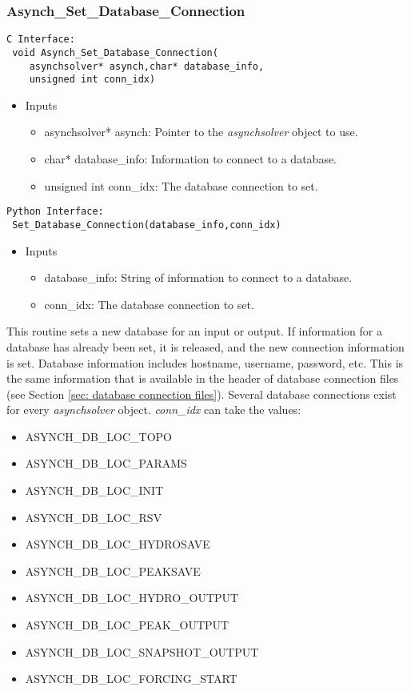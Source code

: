 \documentclass[12pt]{article}
\begin{document}
\subsubsection{Asynch\_Set\_Database\_Connection} \label{sec: asynch_set_database_connection}

\begin{lstlisting}[style=CStyle]
 C Interface:
 void Asynch_Set_Database_Connection(
	asynchsolver* asynch,char* database_info,
	unsigned int conn_idx)
\end{lstlisting}
\begin{itemize}
 \item Inputs
  \begin{itemize}
   \item asynchsolver* asynch: Pointer to the \emph{asynchsolver} object to use.
   \item char* database\_info: Information to connect to a database.
   \item unsigned int conn\_idx: The database connection to set.
  \end{itemize}
\end{itemize}
\begin{lstlisting}[style=PythonStyle]
 Python Interface:
 Set_Database_Connection(database_info,conn_idx)
\end{lstlisting}
\begin{itemize}
 \item Inputs
  \begin{itemize}
   \item database\_info: String of information to connect to a database.
   \item conn\_idx: The database connection to set.
  \end{itemize}
\end{itemize}
This routine sets a new database for an input or output. If information for a database has already been set, it is released, and the new connection information is set. Database information includes hostname, username, password, etc. This is the same information that is available in the header of database connection files (see Section \ref{sec: database connection files}). Several database connections exist for every \emph{asynchsolver} object. \emph{conn\_idx} can take the values:
\begin{itemize}
 \item ASYNCH\_DB\_LOC\_TOPO
 \item ASYNCH\_DB\_LOC\_PARAMS
 \item ASYNCH\_DB\_LOC\_INIT
 \item ASYNCH\_DB\_LOC\_RSV
 \item ASYNCH\_DB\_LOC\_HYDROSAVE
 \item ASYNCH\_DB\_LOC\_PEAKSAVE
 \item ASYNCH\_DB\_LOC\_HYDRO\_OUTPUT
 \item ASYNCH\_DB\_LOC\_PEAK\_OUTPUT
 \item ASYNCH\_DB\_LOC\_SNAPSHOT\_OUTPUT
 \item ASYNCH\_DB\_LOC\_FORCING\_START
\end{itemize}
\end{document}
